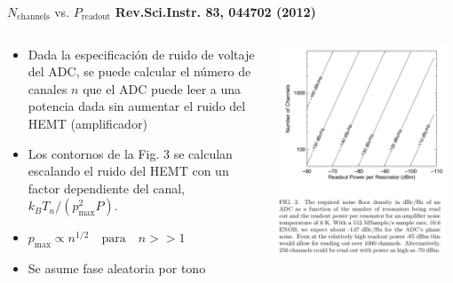 \documentclass[ignorenonframetext,12pt]{beamer}
\begin{document}
\begin{frame}{$N_\text{channels}$ vs. $P_\text{readout}$}
				\footnotesize{\textbf{Rev.Sci.Instr. 83, 044702 (2012)}}
				\begin{columns}
								\begin{column}{0.5\textwidth}
												\begin{itemize}
																\item \footnotesize{Dada la especificación de
																				ruido de voltaje del ADC, se puede
																				calcular el número de canales
																				{\color{blue}$n$} que el ADC puede leer
																				a una potencia dada sin aumentar el
																				ruido del HEMT (amplificador)}
																\item Los contornos de la Fig. 3 se calculan
																				escalando  el ruido del HEMT con un
																				factor dependiente del canal, $k_B
																				T_n /(p_\text{max}^2 P)$.
																\item $p_\text{max} \propto
																				n^{1/2}\quad\text{para}\quad n >> 1$
																\item Se asume fase aleatoria por tono
												\end{itemize}
								\end{column}
								\begin{column}{0.5\textwidth}
												\includegraphics[width=0.95\textwidth]{power_vs_Nchannels}
								\end{column}
				\end{columns}
\end{frame}
\end{document}
